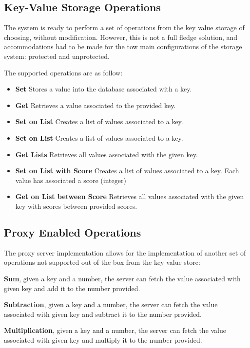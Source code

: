 \subsection{Key-Value Storage Operations}
\label{ssec:key-value_storage_operations}

The system is ready to perform a set of operations from the key value storage of choosing, without modification. However, this is not a full fledge solution, and accommodations had to be made for the tow main configurations of the storage system: protected and unprotected.

The supported operations are as follow:

\begin{itemize}
  \item \textbf{Set} Stores a value into the database associated with a key.
  \item \textbf{Get} Retrieves a value associated to the provided key.
  \item \textbf{Set on List} Creates a list of values associated to a key.
  \item \textbf{Set on List} Creates a list of values associated to a key.
  \item \textbf{Get Lists} Retrieves all values associated with the given key.
  \item \textbf{Set on List with Score} Creates a list of values associated to a key. Each value has associated a score (integer)
  \item \textbf{Get on List between Score} Retrieves all values associated with the given key with scores between provided scores. 
\end{itemize}

\subsection{Proxy Enabled Operations}
\label{ssec:proxy_enabled_operations}

The proxy server implementation allows for the implementation of another set of operations not supported out of the box from the key value store:

\textbf{Sum}, given a key and a number, the server can fetch the value associated with given key and add it to the number provided.

\textbf{Subtraction}, given a key and a number, the server can fetch the value associated with given key and subtract it to the number provided.

\textbf{Multiplication}, given a key and a number, the server can fetch the value associated with given key and multiply it to the number provided.

